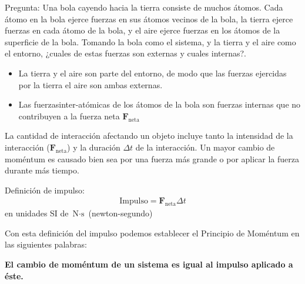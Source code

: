   

\begin{frame}
  \begin{block}%
{Pregunta:} Una bola cayendo hacia la tierra consiste de muchos
  átomos. Cada átomo en la bola ejerce fuerzas en sus átomos vecinos
  de la bola, la tierra ejerce fuerzas en cada átomo de la bola, y el
  aire ejerce fuerzas en los átomos de la superficie de la
  bola. Tomando la bola como el sistema, y la tierra y el aire como el
  entorno, ¿cuales de estas fuerzas son externas y cuales internas?.
    
  \end{block}

  
\end{frame}

\begin{frame}
\begin{itemize}
  \item     \alert{La tierra y el aire} son parte del entorno, de modo que las fuerzas
    ejercidas por la tierra el aire son ambas \alert{externas}.
  \item Las fuerzas\alert{inter-atómicas} de los átomos de la bola son
    fuerzas \alert{internas} que no contribuyen a la fuerza neta $\mathbf{F}_{\text{neta}}$
  \end{itemize}
  
\end{frame}

\begin{frame}
  La cantidad de interacción afectando un objeto incluye tanto la \alert{intensidad de la interacción} ($\mathbf{F}_{\text{neta}}$) y la \alert{duración} $\Delta t$ de la interacción. Un mayor cambio de moméntum es causado bien sea por una fuerza más grande o por aplicar la fuerza durante más tiempo.
\end{frame}

\begin{frame}
{Definición de impulso:}
\begin{align}
  \text{Impulso}=\mathbf{F}_{\text{neta}}\Delta t
\end{align}
en unidades SI de $\text{N}\cdot\text{s}$ (newton-segundo)
\end{frame}

Con esta definición del impulso podemos establecer el Principio de Moméntum en las siguientes palabras:
\begin{frame}
  \begin{center}
    \textbf{El cambio de moméntum de un sistema es igual al impulso aplicado a éste.}
  \end{center}
\end{frame}

